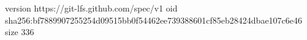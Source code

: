 version https://git-lfs.github.com/spec/v1
oid sha256:bf7889907255254d09515bb0f54462ee739388601cf85eb28424dbae107c6e46
size 336
